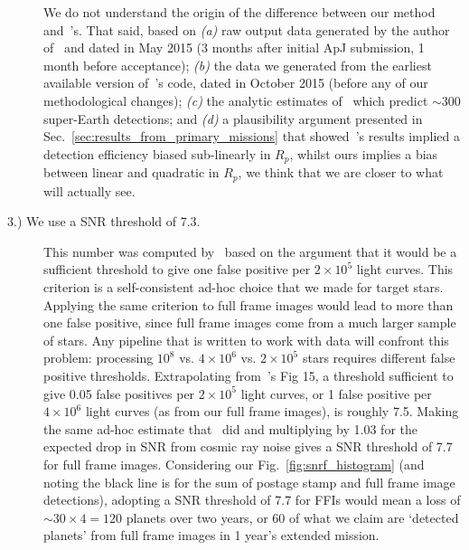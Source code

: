 \begin{description}
	We do not understand the origin of the difference between our method and~'s.
	That said, based on 
	\textit{(a)} raw output data generated by the author of~ and dated in May 2015 (3 months after initial ApJ submission, 1 month before acceptance); 
	\textit{(b)} the data we generated from the earliest available version of~'s code, dated in October 2015 (before any of our methodological changes); 
	\textit{(c)} the analytic estimates of~\citet{winn_searchable_2013} which predict $\sim300$ super-Earth detections;
	and \textit{(d)} a plausibility argument presented in Sec.~\ref{sec:results_from_primary_missions} that showed~'s results implied a detection efficiency biased sub-linearly in $R_p$, whilst ours implies a bias between linear and quadratic in $R_p$,
	we think that we are closer to what \tess will actually see.
	
	\item[3.) We use a SNR threshold of 7.3.] This number was computed by~ based on the argument that it would be a sufficient threshold to give one false positive per $2\times10^5$ light curves.
	This criterion is a self-consistent ad-hoc choice that we made for target stars.
	Applying the same criterion to full frame images would lead to more than one false positive, since full frame images come from a much larger sample of stars.
	Any pipeline that is written to work with \tess data will confront this problem:
	processing $10^8$ vs. $4\times10^6$ vs. $2\times10^5$ stars requires different false positive thresholds.
	Extrapolating from~'s Fig 15, a threshold sufficient to give 0.05 false positives per $2\times10^5$ light curves, or 1 false positive per $4\times10^6$ light curves (as from our full frame images), is roughly 7.5.
	Making the same ad-hoc estimate that~ did and multiplying by 1.03 for the expected drop in SNR from cosmic ray noise gives a SNR threshold of 7.7 for full frame images.
	Considering our Fig.~\ref{fig:snrf_histogram} (and noting the black line is for the sum of postage stamp and full frame image detections), adopting a SNR threshold of 7.7 for FFIs would mean a loss of $\sim30\times4=120$ planets over two years, or 60 of what we claim are `detected planets' from full frame images in 1 year's extended mission.	
	

\end{description}
